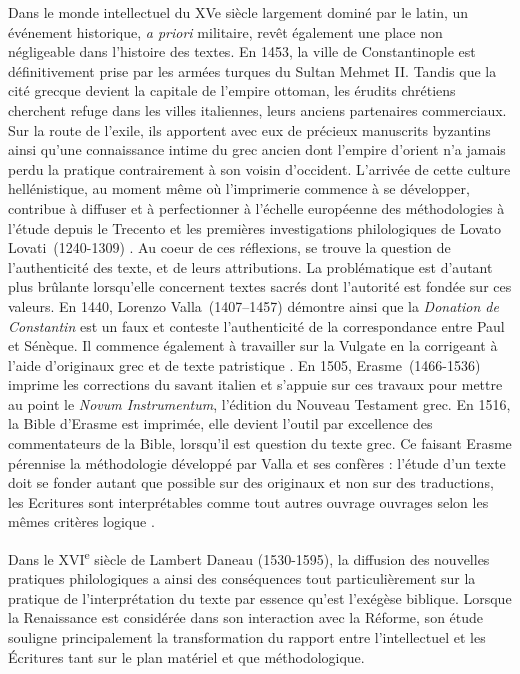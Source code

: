 \documentclass[11pt,french]{article}
\begin{document}
Dans le monde intellectuel du XVe siècle largement dominé par le latin, un événement historique, \textit{a priori} militaire, revêt également une place non négligeable dans l'histoire des textes. En 1453, la ville de Constantinople est définitivement prise par les armées turques du Sultan Mehmet II. Tandis que la cité grecque devient la capitale de l'empire ottoman, les érudits chrétiens cherchent refuge dans les villes italiennes, leurs anciens partenaires commerciaux. Sur la route de l'exile, ils apportent avec eux de précieux manuscrits byzantins ainsi qu'une connaissance intime du grec ancien dont l'empire d'orient n'a jamais perdu la pratique contrairement à son voisin d'occident. L'arrivée de cette culture hellénistique, au moment même où l'imprimerie commence à se développer, contribue à diffuser et à perfectionner à l'échelle européenne des méthodologies à l'étude depuis le Trecento et les premières investigations philologiques de Lovato Lovati~(1240-1309) \cite[p.101-104]{reynoldsChapitreIVRenaissance2021}. Au coeur de ces réflexions, se trouve la question de l'authenticité des texte, et de leurs attributions. La problématique est d'autant plus brûlante lorsqu'elle concernent textes sacrés dont l'autorité est fondée sur ces valeurs. En 1440, Lorenzo Valla~(1407–1457) démontre ainsi que la \textit{Donation de Constantin} est un faux et conteste l'authenticité de la correspondance entre Paul et Sénèque. Il commence également à travailler sur la Vulgate en la corrigeant à l'aide d'originaux grec et de texte patristique \cite[p.118]{reynoldsChapitreIVRenaissance2021}. En 1505, Erasme~(1466-1536) imprime les corrections du savant italien et s'appuie sur ces travaux pour mettre au point le \textit{Novum Instrumentum}, l'édition du Nouveau Testament grec. En 1516, la Bible d'Erasme est imprimée, elle devient l'outil par excellence des commentateurs de la Bible, lorsqu'il est question du texte grec. Ce faisant Erasme pérennise la méthodologie développé par Valla et ses confères : l'étude d'un texte doit se fonder autant que possible sur des originaux et non sur des traductions, les Ecritures sont interprétables comme tout autres ouvrage ouvrages selon les mêmes critères logique \cite[p.~126]{reynoldsChapitreIVRenaissance2021}.\par 
Dans le XVI\textsuperscript{e} siècle de Lambert Daneau (1530-1595), la diffusion des nouvelles pratiques philologiques a ainsi des conséquences tout particulièrement sur la pratique de l’interprétation du texte par essence qu’est l’exégèse biblique. Lorsque la Renaissance est considérée dans son interaction avec la Réforme, son étude souligne principalement la transformation du rapport entre l'intellectuel et les Écritures tant sur le plan matériel et que méthodologique.\par
\end{document}
